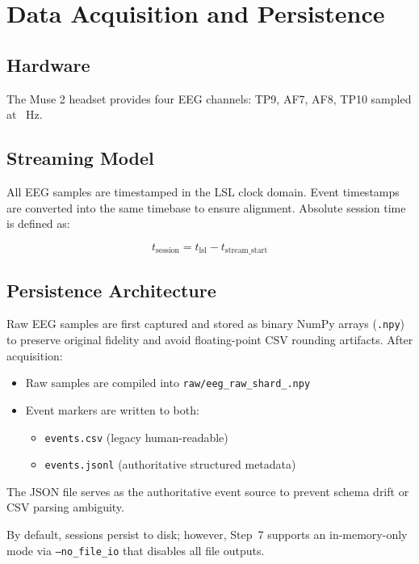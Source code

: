 \documentclass[conference]{IEEEtran}
\begin{document}
\section{Data Acquisition and Persistence}

\subsection{Hardware}

The Muse 2 headset provides four EEG channels:
TP9, AF7, AF8, TP10 sampled at \TargetFsHz~Hz.

\subsection{Streaming Model}

All EEG samples are timestamped in the LSL clock domain. Event timestamps are converted into the same timebase to ensure alignment. Absolute session time is defined as:

\[
t_{\text{session}} = t_{\text{lsl}} - t_{\text{stream\_start}}
\]

\subsection{Persistence Architecture}

Raw EEG samples are first captured and stored as binary NumPy arrays (\texttt{.npy}) to preserve original fidelity and avoid floating-point CSV rounding artifacts. After acquisition:

\begin{itemize}
\item Raw samples are compiled into \texttt{raw/eeg\_raw\_shard\_\*.npy}
\item Event markers are written to both:
  \begin{itemize}
  \item \texttt{events.csv} (legacy human-readable)
  \item \texttt{events.jsonl} (authoritative structured metadata)
  \end{itemize}
\end{itemize}

The JSON file serves as the authoritative event source to prevent schema drift or CSV parsing ambiguity.

By default, sessions persist to disk; however, Step~7 supports an in-memory-only mode via \texttt{--no\_file\_io} that disables all file outputs.
\end{document}
